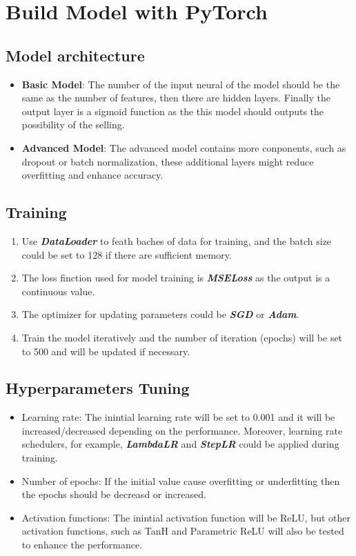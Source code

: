 \documentclass[12pt,twoside]{report}
\begin{document}
\section{Build Model with PyTorch}
\subsection{Model architecture}
\begin{itemize}
	\item \textbf{Basic Model}: The number of the input neural of the model should be the same as the number of features, then there are hidden layers. Finally the output layer is a sigmoid function as the this model should outputs the possibility of the selling. 
	\item \textbf{Advanced Model}: The advanced model contains more conponents, such as dropout or batch normalization, these additional layers might reduce overfitting and enhance accuracy. 
\end{itemize}

\subsection{Training}
\begin{enumerate}
	\item Use \textbf{\textit{DataLoader}} to feath baches of data for training, and the batch  size could be set to 128 if there are sufficient memory. 
	\item The loss finction used for model training is \textbf{\textit{MSELoss}} as the output is a continuous value. 
	\item The optimizer for updating parameters could be \textbf{\textit{SGD}} or \textbf{\textit{Adam}}.
	\item Train the model iteratively and the number of iteration (epochs) will be set to 500 and will be updated if necessary. 
\end{enumerate}

\subsection{Hyperparameters Tuning}
\begin{itemize}
	\item Learning rate: The inintial learning rate will be set to 0.001 and it will be increased/decreased depending on the performance. Moreover, learning rate schedulers, for example, \textbf{\textit{LambdaLR}} and \textbf{\textit{StepLR}} could be applied during training. 
	\item Number of epochs: If the initial value cause overfitting or underfitting then the epochs should be decreasd or increased. 
	\item Activation functions: The inintial activation function will be ReLU, but other activation functions, such as TanH and Parametric ReLU will also be tested to enhance the performance. 
\end{itemize}
\end{document}
